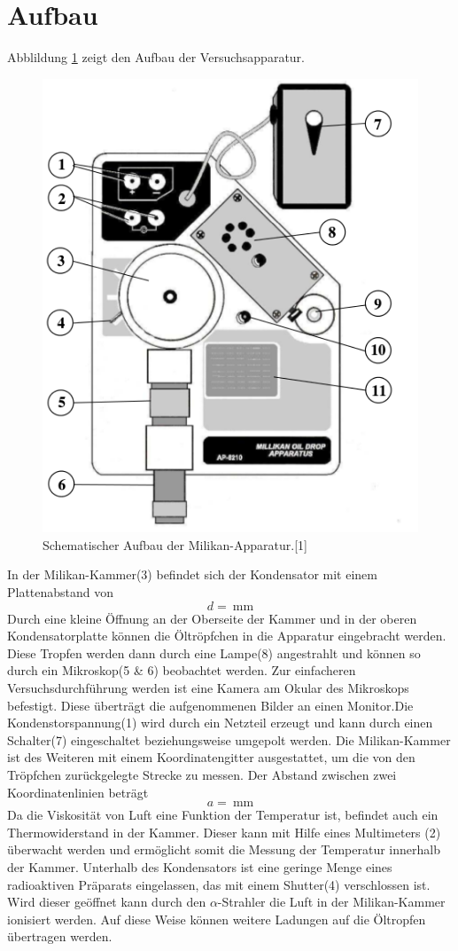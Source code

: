\documentclass[11pt,ngerman,a4paper]{article}
\begin{document}
\section{Aufbau}
Abblildung \ref{aufbau} zeigt den Aufbau der Versuchsapparatur.

\begin{figure}[htp]
\centering
\includegraphics[scale=0.50]{abb2.png}
\caption{Schematischer Aufbau der Milikan-Apparatur.[1]}
\label{aufbau}
\end{figure}

\noindent
 In der Milikan-Kammer(3) befindet sich der Kondensator mit einem Plattenabstand von
\[
d = \SI{}{\milli\meter}
\]
Durch eine kleine Öffnung an der Oberseite der Kammer und in der oberen Kondensatorplatte können die Öltröpfchen in die Apparatur eingebracht werden. Diese Tropfen werden dann durch eine Lampe(8) angestrahlt und können so durch ein Mikroskop(5 \& 6) beobachtet werden. Zur einfacheren Versuchsdurchführung werden ist eine Kamera am Okular des Mikroskops befestigt. Diese überträgt die aufgenommenen Bilder an einen Monitor.Die Kondenstorspannung(1) wird durch ein Netzteil erzeugt und kann durch einen Schalter(7) eingeschaltet beziehungsweise umgepolt werden. 
Die Milikan-Kammer ist des Weiteren mit einem Koordinatengitter ausgestattet, um die von den Tröpfchen zurückgelegte Strecke zu messen. Der Abstand zwischen zwei Koordinatenlinien beträgt
\[
a = \SI{}{\milli\meter}
\]
Da die Viskosität von Luft eine Funktion der Temperatur ist, befindet auch ein Thermowiderstand in der Kammer. Dieser kann mit Hilfe eines Multimeters (2) überwacht werden und ermöglicht somit die Messung der Temperatur innerhalb der Kammer. Unterhalb des Kondensators ist eine geringe Menge eines radioaktiven Präparats eingelassen, das mit einem Shutter(4) verschlossen ist. Wird dieser geöffnet kann durch den $\alpha$-Strahler die Luft in der Milikan-Kammer ionisiert werden. Auf diese Weise können weitere Ladungen auf die Öltropfen übertragen werden.
\end{document}
